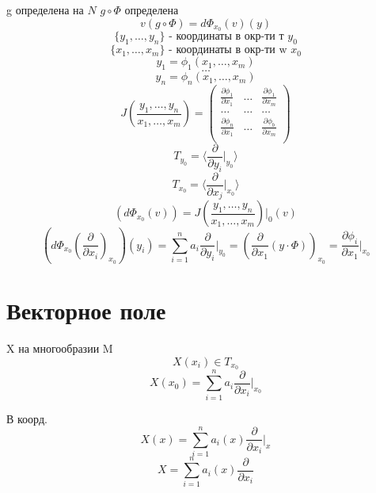 \documentclass[a4paper]{article}
\theoremstyle{definition}
\begin{document}
g определена на $ N $ $ g \circ \Phi $ определена 
\[
    v(g \circ \Phi) = d \Phi_{x_0}(v)(y)
\]
\[
    \{ y_1, \dots, y_n \} \text{ - координаты в окр-ти т } y_0
\]
\[
    \{ x_1, \dots, x_m \} \text{ - координаты в окр-ти w } x_0
\]
\[
    y_1 = \phi_1(x_1, \dots, x_m)
\]
\[
    \dots
\]
\[
    y_n = \phi_n(x_1, \dots, x_m)
\]
\[
    J\left( \frac{y_1, \dots, y_n}{x_1, \dots, x_m}\right) =
    \begin{pmatrix}
    \frac{\partial \phi_1}{\partial x_1}  & \dots & \frac{\partial \phi_1}{\partial x_m} \\
    \dots & \dots & \dots\\
     \frac{\partial \phi_n}{\partial x_1}& \dots  & \frac{\partial \phi_b}{\partial x_m}\\
    
    \end{pmatrix}
\]
\[
    T_{y_0} = \langle \frac{\partial}{\partial y_i} \big|_{y_0} \rangle
\]
\[
    T_{x_0} = \langle \frac{\partial}{\partial x_j} \big|_{x_0} \rangle
\]
\[
    ( d \Phi_{x_0}(v)) = J\left( \frac{y_1, \dots, y_n}{x_1, \dots, x_m}\right)\big|_0(v)
\]
\[
    \left( d \Phi_{x_0}\left(\frac{\partial}{\partial x_i}\right)_{x_0}\right) (y_i)
    = \sum_{i=1}^{n} a_i \frac{\partial}{\partial y_i} \big|_{y_0} =
    \left(\frac{\partial}{\partial x_1} ( y \cdot \Phi)\right)_{x_0}
    = \frac{\partial \phi_i}{\partial x_1} \big|_{x_0}
\]

\section*{Векторное поле}
X на многообразии M
\[
    X(x_i) \in T_{x_0}
\]
\[
    X(x_0) = \sum_{i=1}^{n} a_i \frac{\partial}{\partial x_i} \big|_{x_0}
\]

В коорд.
\[
    X(x) = \sum_{i=1}^{n} a_i(x) \frac{\partial}{\partial x_i} \big|_{x}
\]
\[
    X = \sum_{i=1}^{n} a_i(x) \frac{\partial}{\partial x_i}
\]
\end{document}
